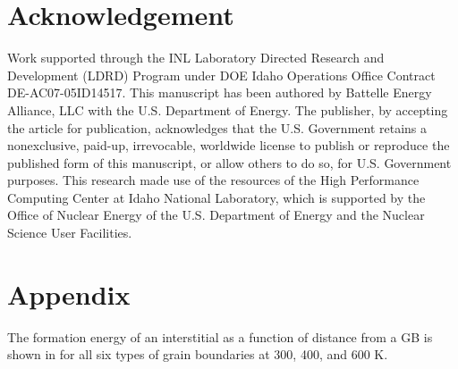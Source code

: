 \documentclass[review]{elsarticle}
\begin{document}
\section{Acknowledgement}
Work supported through the INL Laboratory Directed Research and Development (LDRD) Program under DOE Idaho Operations Office Contract DE-AC07-05ID14517. This manuscript has been authored by Battelle Energy Alliance, LLC with the U.S. Department of Energy. The publisher, by accepting the article for publication, acknowledges that the U.S. Government retains a nonexclusive, paid-up, irrevocable, worldwide license to publish or reproduce the published form of this manuscript, or allow others to do so, for U.S. Government purposes. This research made use of the resources of the High Performance Computing Center at Idaho National Laboratory, which is supported by the Office of Nuclear Energy of the U.S. Department of Energy and the Nuclear Science User Facilities.


 \newpage

\section{Appendix}
\setcounter{figure}{0}
\setcounter{table}{0}
\renewcommand{\thefigure}{A\arabic{figure}}
\renewcommand{\thetable}{A\arabic{table}}
\setlength{\arrayrulewidth}{.5mm}
\setlength{\tabcolsep}{12pt}
\renewcommand{\arraystretch}{1.0}

The formation energy of an interstitial as a function of distance from a GB is shown in  for all six types of grain boundaries at 300, 400, and 600 K.
\end{document}
